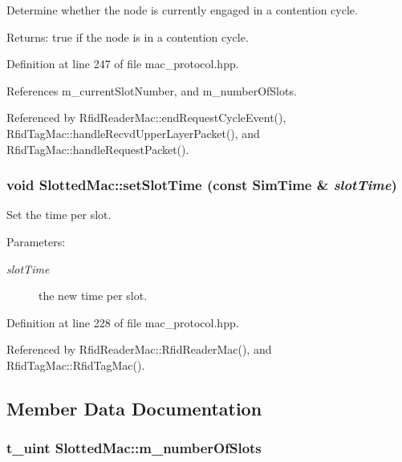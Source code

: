 Determine whether the node is currently engaged in a contention cycle. 

\begin{Desc}
\item[Returns:]true if the node is in a contention cycle. \end{Desc}


Definition at line 247 of file mac\_\-protocol.hpp.

References m\_\-current\-Slot\-Number, and m\_\-number\-Of\-Slots.

Referenced by Rfid\-Reader\-Mac::end\-Request\-Cycle\-Event(), Rfid\-Tag\-Mac::handle\-Recvd\-Upper\-Layer\-Packet(), and Rfid\-Tag\-Mac::handle\-Request\-Packet().
\subsubsection{\setlength{\rightskip}{0pt plus 5cm}void Slotted\-Mac::set\-Slot\-Time (const \bf{Sim\-Time} \& {\em slot\-Time})\hspace{0.3cm}{\tt  [inline, protected]}}\label{classSlottedMac_8c2f671fe54da66a7a930db211239018}


Set the time per slot. 

\begin{Desc}
\item[Parameters:]
\begin{description}
\item[{\em slot\-Time}]the new time per slot. \end{description}
\end{Desc}


Definition at line 228 of file mac\_\-protocol.hpp.

Referenced by Rfid\-Reader\-Mac::Rfid\-Reader\-Mac(), and Rfid\-Tag\-Mac::Rfid\-Tag\-Mac().

\subsection{Member Data Documentation}
\subsubsection{\setlength{\rightskip}{0pt plus 5cm}\bf{t\_\-uint} \bf{Slotted\-Mac::m\_\-number\-Of\-Slots}\hspace{0.3cm}{\tt  [protected]}}\label{classSlottedMac_69376c02ac9cd637729a72241beafbb9}


